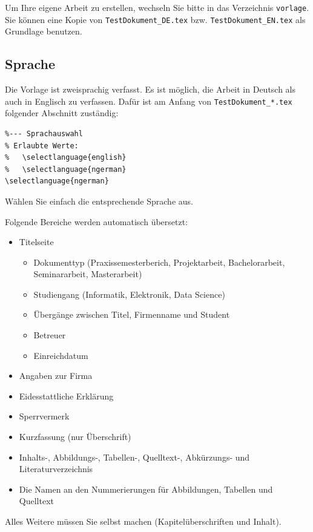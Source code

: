 \documentclass[pdftex,a4paper]{scrartcl}
\begin{document}
Um Ihre eigene Arbeit zu erstellen, wechseln Sie bitte in das Verzeichnis
\texttt{vorlage}.
Sie können eine Kopie von \texttt{TestDokument\_DE.tex} bzw. \texttt{TestDokument\_EN.tex} als Grundlage benutzen.

\subsection{Sprache}
\label{sec:sprache}

Die Vorlage ist zweisprachig verfasst.
Es ist möglich, die Arbeit in Deutsch als auch in Englisch zu verfassen.
Dafür ist am Anfang von \texttt{TestDokument\_*.tex} folgender Abschnitt zuständig:

\begin{verbatim}
%--- Sprachauswahl
% Erlaubte Werte:
%   \selectlanguage{english}
%   \selectlanguage{ngerman}
\selectlanguage{ngerman}
\end{verbatim}

Wählen Sie einfach die entsprechende Sprache aus.

Folgende Bereiche werden automatisch übersetzt:

\begin{itemize}
  \item Titelseite
  \begin{itemize}
    \item Dokumenttyp (Praxissemesterberich, Projektarbeit, Bachelorarbeit, Seminararbeit, Masterarbeit)
    \item Studiengang (Informatik, Elektronik, Data Science)
    \item Übergänge zwischen Titel, Firmenname und Student
    \item Betreuer
    \item Einreichdatum
  \end{itemize}
  \item Angaben zur Firma
  \item Eidesstattliche Erklärung
  \item Sperrvermerk
  \item Kurzfassung (nur Überschrift)
  \item Inhalts-, Abbildungs-, Tabellen-, Quelltext-, Abkürzungs- und Literaturverzeichnis
  \item Die Namen an den Nummerierungen für Abbildungen, Tabellen und Quelltext
\end{itemize}

Alles Weitere müssen Sie selbst machen (Kapitelüberschriften und Inhalt).
\end{document}

